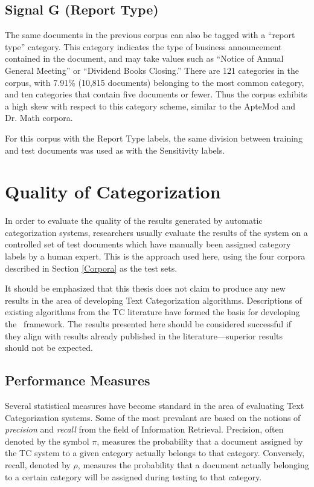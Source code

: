 \subsection{Signal G (Report Type)}

The same documents in the previous corpus can also be tagged with a
``report type'' category.  This category indicates the type of
business announcement contained in the document, and may take values
such as ``Notice of Annual General Meeting'' or ``Dividend Books
Closing.''  There are 121 categories in the corpus, with 7.91\%
(10,815 documents) belonging to the most common category, and ten
categories that contain five documents or fewer.  Thus the corpus
exhibits a high skew with respect to this category scheme, similar to
the ApteMod and Dr. Math corpora.

For this corpus with the Report Type labels, the same division between
training and test documents was used as with the Sensitivity labels.



\section{Quality of Categorization}
\label{Quality}

In order to evaluate the quality of the results generated by automatic
categorization systems, researchers usually evaluate the results of
the system on a controlled set of test documents which have manually
been assigned category labels by a human expert.
\cite[pp. 9 \& 37]{sebastiani:02} This is the approach used here,
using the four corpora described in Section \ref{Corpora} as the test
sets.

It should be emphasized that this thesis does not claim to produce any
new results in the area of developing Text Categorization algorithms.
Descriptions of existing algorithms from the TC literature have formed
the basis for developing the \aicat\ framework.  The results presented
here should be considered successful if they align with results
already published in the literature---superior results should not be
expected.

\subsection{Performance Measures}
\label{measures}

Several statistical measures have become standard in the area of
evaluating Text Categorization systems.\cite[p. 33]{sebastiani:02}
Some of the most prevalant are based on the notions of
\emph{precision} and \emph{recall} from the field of Information
Retrieval.\cite{rijsbergen:79} Precision, often denoted by the symbol
$\pi$, measures the probability that a document assigned by the TC
system to a given category actually belongs to that category.
Conversely, recall, denoted by $\rho$, measures the probability that a
document actually belonging to a certain category will be assigned
during testing to that category.\cite[p. 33]{sebastiani:02}

